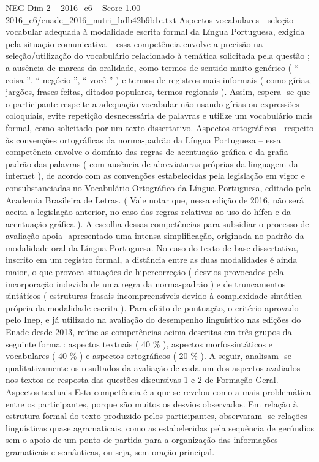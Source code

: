 \begin{textsample}{NEG Dim 2 – 2016\_c6 – Score 1.00 – 2016\_c6/enade\_2016\_nutri\_bdb42b9b1c.txt}
Aspectos vocabulares - seleção vocabular adequada à modalidade escrita formal da Língua Portuguesa, exigida pela situação comunicativa – essa competência envolve a precisão na seleção/utilização do vocabulário relacionado à temática solicitada pela questão ; a ausência de marcas da oralidade, como termos de sentido muito genérico ( “ coisa ”, “ negócio ”, “ você ” ) e termos de registros mais informais ( como gírias, jargões, frases feitas, ditados populares, termos regionais ).
Assim, espera -se que o participante respeite a adequação vocabular não usando gírias ou expressões coloquiais, evite repetição desnecessária de palavras e utilize um vocabulário mais formal, como solicitado por um texto dissertativo.
Aspectos ortográficos - respeito às convenções ortográficas da norma-padrão da Língua Portuguesa – essa competência envolve o domínio das regras de acentuação gráfica e da grafia padrão das palavras ( com ausência de abreviaturas próprias da linguagem da internet ), de acordo com as convenções estabelecidas pela legislação em vigor e consubstanciadas no Vocabulário Ortográfico da Língua Portuguesa, editado pela Academia Brasileira de Letras. ( Vale notar que, nessa edição de 2016, não será aceita a legislação anterior, no caso das regras relativas ao uso do hífen e da acentuação gráfica ).
A escolha dessas competências para subsidiar o processo de avaliação apoia- apresentado uma intensa simplificação, originada no padrão da modalidade oral da Língua Portuguesa.
No caso do texto de base dissertativa, inscrito em um registro formal, a distância entre as duas modalidades é ainda maior, o que provoca situações de hipercorreção ( desvios provocados pela incorporação indevida de uma regra da norma-padrão ) e de truncamentos sintáticos ( estruturas frasais incompreensíveis devido à complexidade sintática própria da modalidade escrita ).
Para efeito de pontuação, o critério aprovado pelo Inep, e já utilizado na avaliação do desempenho linguístico nas edições do Enade desde 2013, reúne as competências acima descritas em três grupos da seguinte forma : aspectos textuais ( 40 \% ), aspectos morfossintáticos e vocabulares ( 40 \% ) e aspectos ortográficos ( 20 \% ).
A seguir, analisam -se qualitativamente os resultados da avaliação de cada um dos aspectos avaliados nos textos de resposta das questões discursivas 1 e 2 de Formação Geral.
Aspectos textuais Esta competência é a que se revelou como a mais problemática entre os participantes, porque são muitos os desvios observados.
Em relação à estrutura formal do texto produzido pelos participantes, observaram -se relações linguísticas quase agramaticais, como as estabelecidas pela sequência de gerúndios sem o apoio de um ponto de partida para a organização das informações gramaticais e semânticas, ou seja, sem oração principal.

\end{textsample}
